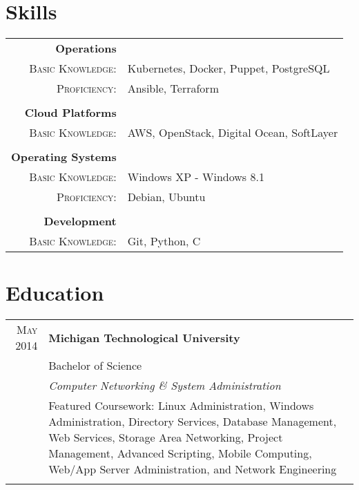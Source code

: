 \documentclass[a4paper,9pt]{extarticle}
\begin{document}
\section{Skills}
\begin{tabular}{rl}
 \textbf{Operations}&\\\textsc{Basic Knowledge:}&\footnotesize{Kubernetes, Docker, Puppet, PostgreSQL}\\\textsc{Proficiency:}&\footnotesize{Ansible, Terraform}\\\multicolumn{2}{c}{}\\
 \textbf{Cloud Platforms}&\\\textsc{Basic Knowledge:}&\footnotesize{AWS, OpenStack, Digital Ocean, SoftLayer}\\\multicolumn{2}{c}{}\\
 \textbf{Operating Systems}&\\\textsc{Basic Knowledge:}&\footnotesize{Windows XP - Windows 8.1}\\\textsc{Proficiency:}&\footnotesize{Debian, Ubuntu}\\\multicolumn{2}{c}{}\\
 \textbf{Development}&\\\textsc{Basic Knowledge:}&\footnotesize{Git, Python, C}
\end{tabular}

\section{Education}
\begin{tabular}{rp{8.5cm}}
 \textsc{May 2014}&\textbf{Michigan Technological University}\\&Bachelor of Science\\&\emph{Computer Networking \& System Administration}\\&\footnotesize{Featured Coursework: Linux Administration, Windows Administration, Directory Services, Database Management, Web Services, Storage Area Networking, Project Management, Advanced Scripting, Mobile Computing, Web/App Server Administration, and Network Engineering}\\\multicolumn{2}{c}{}\\
\end{tabular}
\end{document}
